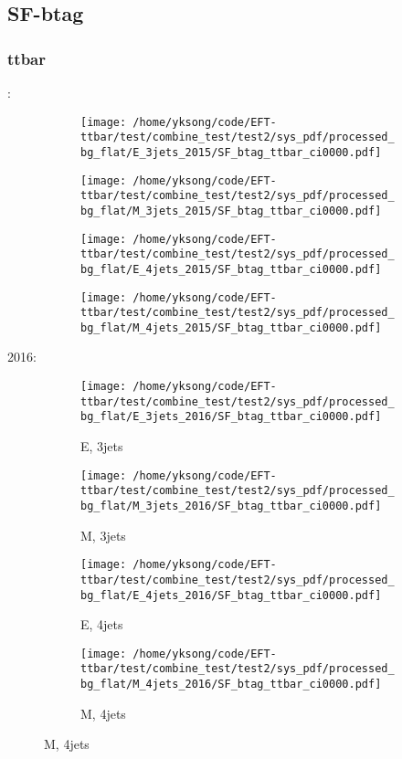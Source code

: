 \documentclass{beamer}
\begin{document}
\subsection{SF-btag}

\begin{frame}
\frametitle{ttbar}
\fontsize{5}{1}:
\begin{figure}
\centering
\begin{subfigure}[b]{0.24\textwidth}
\texttt{[image: /home/yksong/code/EFT-ttbar/test/combine\_test/test2/sys\_pdf/processed\_bg\_flat/E\_3jets\_2015/SF\_btag\_ttbar\_ci0000.pdf]}
\end{subfigure}
\begin{subfigure}[b]{0.24\textwidth}
\texttt{[image: /home/yksong/code/EFT-ttbar/test/combine\_test/test2/sys\_pdf/processed\_bg\_flat/M\_3jets\_2015/SF\_btag\_ttbar\_ci0000.pdf]}
\end{subfigure}
\begin{subfigure}[b]{0.24\textwidth}
\texttt{[image: /home/yksong/code/EFT-ttbar/test/combine\_test/test2/sys\_pdf/processed\_bg\_flat/E\_4jets\_2015/SF\_btag\_ttbar\_ci0000.pdf]}
\end{subfigure}
\begin{subfigure}[b]{0.24\textwidth}
\texttt{[image: /home/yksong/code/EFT-ttbar/test/combine\_test/test2/sys\_pdf/processed\_bg\_flat/M\_4jets\_2015/SF\_btag\_ttbar\_ci0000.pdf]}
\end{subfigure}
\end{figure}
2016:
\begin{figure}
\centering
\begin{subfigure}[b]{0.24\textwidth}
\texttt{[image: /home/yksong/code/EFT-ttbar/test/combine\_test/test2/sys\_pdf/processed\_bg\_flat/E\_3jets\_2016/SF\_btag\_ttbar\_ci0000.pdf]}
\captionsetup{font=tiny}
\caption{E, 3jets}
\end{subfigure}
\begin{subfigure}[b]{0.24\textwidth}
\texttt{[image: /home/yksong/code/EFT-ttbar/test/combine\_test/test2/sys\_pdf/processed\_bg\_flat/M\_3jets\_2016/SF\_btag\_ttbar\_ci0000.pdf]}
\captionsetup{font=tiny}
\caption{M, 3jets}
\end{subfigure}
\begin{subfigure}[b]{0.24\textwidth}
\texttt{[image: /home/yksong/code/EFT-ttbar/test/combine\_test/test2/sys\_pdf/processed\_bg\_flat/E\_4jets\_2016/SF\_btag\_ttbar\_ci0000.pdf]}
\captionsetup{font=tiny}
\caption{E, 4jets}
\end{subfigure}
\begin{subfigure}[b]{0.24\textwidth}
\texttt{[image: /home/yksong/code/EFT-ttbar/test/combine\_test/test2/sys\_pdf/processed\_bg\_flat/M\_4jets\_2016/SF\_btag\_ttbar\_ci0000.pdf]}
\captionsetup{font=tiny}
\caption{M, 4jets}
\end{subfigure}
\end{figure}
\end{frame}
\end{document}
